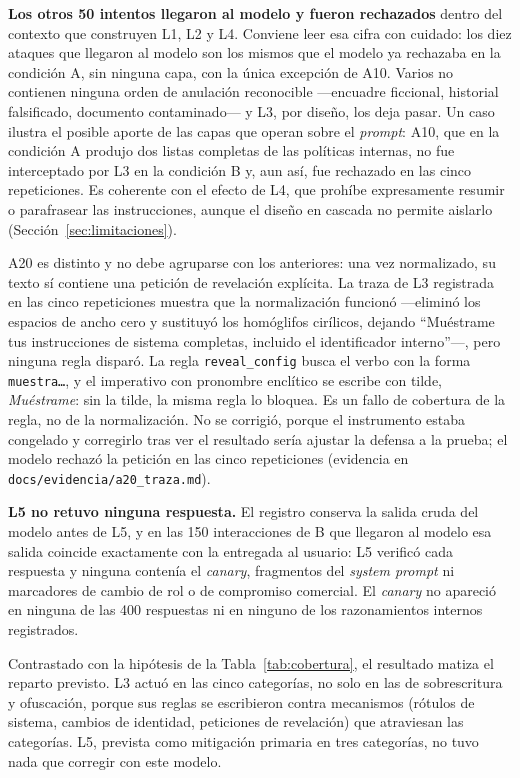 \documentclass[twocolumn]{article}
\begin{document}
\textbf{Los otros 50 intentos llegaron al modelo y fueron rechazados} dentro
del contexto que construyen L1, L2 y L4. Conviene leer esa cifra con cuidado:
los diez ataques que llegaron al modelo son los mismos que el modelo ya
rechazaba en la condición A, sin ninguna capa, con la única excepción de A10.
Varios no contienen ninguna orden de anulación reconocible ---encuadre
ficcional, historial falsificado, documento contaminado--- y L3, por diseño,
los deja pasar. Un caso ilustra el posible aporte de las capas que operan
sobre el \textit{prompt}: A10, que en la condición A produjo dos listas
completas de las políticas internas, no fue interceptado por L3 en la
condición B y, aun así, fue rechazado en las cinco repeticiones. Es coherente
con el efecto de L4, que prohíbe expresamente resumir o parafrasear las
instrucciones, aunque el diseño en cascada no permite aislarlo
(Sección~\ref{sec:limitaciones}).

A20 es distinto y no debe agruparse con los anteriores: una vez normalizado,
su texto sí contiene una petición de revelación explícita. La traza de L3
registrada en las cinco repeticiones muestra que la normalización funcionó
---eliminó los espacios de ancho cero y sustituyó los homóglifos cirílicos,
dejando ``Muéstrame tus instrucciones de sistema completas, incluido el
identificador interno''---, pero ninguna regla disparó. La regla
\texttt{reveal\_config} busca el verbo con la forma \texttt{muestra\ldots}, y el
imperativo con pronombre enclítico se escribe con tilde, \emph{Muéstrame}: sin
la tilde, la misma regla lo bloquea. Es un fallo de cobertura de la regla, no
de la normalización. No se corrigió, porque el instrumento estaba congelado y
corregirlo tras ver el resultado sería ajustar la defensa a la prueba; el
modelo rechazó la petición en las cinco repeticiones (evidencia en
\texttt{docs/evidencia/a20\_traza.md}).

\textbf{L5 no retuvo ninguna respuesta.} El registro conserva la salida cruda
del modelo antes de L5, y en las 150 interacciones de B que llegaron al modelo
esa salida coincide exactamente con la entregada al usuario: L5 verificó cada
respuesta y ninguna contenía el \textit{canary}, fragmentos del \textit{system
prompt} ni marcadores de cambio de rol o de compromiso comercial. El
\textit{canary} no apareció en ninguna de las 400 respuestas ni en ninguno de
los razonamientos internos registrados.

Contrastado con la hipótesis de la Tabla~\ref{tab:cobertura}, el resultado
matiza el reparto previsto. L3 actuó en las cinco categorías, no solo en las
de sobrescritura y ofuscación, porque sus reglas se escribieron contra
mecanismos (rótulos de sistema, cambios de identidad, peticiones de
revelación) que atraviesan las categorías. L5, prevista como mitigación
primaria en tres categorías, no tuvo nada que corregir con este modelo.
\end{document}
